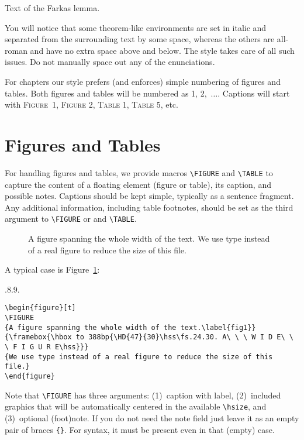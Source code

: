 \documentclass{ics-2015}
\begin{document}
\begin{lemma}
Text of the Farkas lemma.
\end{lemma}

You will notice that some theorem-like environments are set in italic
and separated from the surrounding text by some space, whereas the
others are all-roman and have no extra space above and below. The style
takes care of all such issues. Do not manually space out any of the
enunciations.

For {\ICS} chapters our style prefers (and enforces) simple numbering of figures and tables.
Both figures and tables will be numbered as 1, 2,~$\ldots.$ Captions will start with
\textsc{Figure~1}, \textsc{Figure 2}, \textsc{Table 1}, \textsc{Table 5}, etc.


\section{Figures and Tables}

For handling figures and tables, we provide macros \verb+\FIGURE+
and \verb+\TABLE+ to capture the content of a floating element (figure or table), its caption, and possible notes.
Captions should be kept simple, typically as a sentence fragment. Any additional information, including
table footnotes, should be set as the third argument to
\verb+\FIGURE+ or and \verb+\TABLE+.


\begin{figure}[t]
\FIGURE
{A figure spanning the whole width of the text.\label{fig1}}
{}
{We use type instead of a real figure to reduce the size of this file.}
\end{figure}

A typical case is Figure~\ref{fig1}:

{\fs.8.9.\relax
\begin{verbatim}
\begin{figure}[t]
\FIGURE
{A figure spanning the whole width of the text.\label{fig1}}
{\framebox{\hbox to 388bp{\HD{47}{30}\hss\fs.24.30. A\ \ \ W I D E\ \ \ F I G U R E\hss}}}
{We use type instead of a real figure to reduce the size of this file.}
\end{figure}
\end{verbatim}}

\noindent Note that \verb+\FIGURE+ has three arguments:
(1)~caption with label,
(2)~included graphics that will be automatically centered in the available \verb+\hsize+,
and
(3)~optional (foot)note. If you do not need
the note field just leave it as an empty pair of braces \verb+{}+. For syntax, it must be
present even in that (empty) case.
\end{document}

